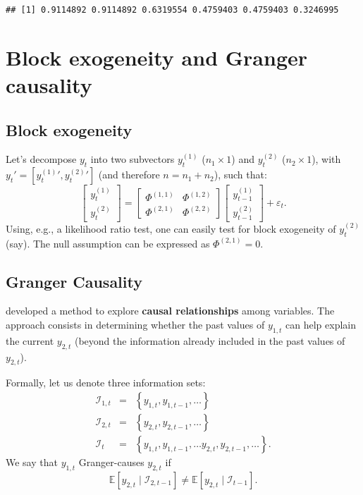 \documentclass[
  12pt,
]{book}
\theoremstyle{definition}
\theoremstyle{definition}
\theoremstyle{definition}
\theoremstyle{definition}
\theoremstyle{remark}
\begin{document}
\begin{verbatim}
## [1] 0.9114892 0.9114892 0.6319554 0.4759403 0.4759403 0.3246995
\end{verbatim}

\hypertarget{BlockGranger}{%
\section{Block exogeneity and Granger causality}\label{BlockGranger}}

\hypertarget{block-exogeneity}{%
\subsection{Block exogeneity}\label{block-exogeneity}}

Let's decompose \(y_t\) into two subvectors \(y^{(1)}_{t}\) (\(n_1 \times 1\)) and \(y^{(2)}_{t}\) (\(n_2 \times 1\)), with \(y_t' = [{y^{(1)}_{t}}',{y^{(2)}_{t}}']\) (and therefore \(n=n_1 +n_2\)), such that:
\[
\left[
\begin{array}{c}
y^{(1)}_{t}\\
y^{(2)}_{t}
\end{array}
\right] = \left[
\begin{array}{cc}
\Phi^{(1,1)} & \Phi^{(1,2)}\\
\Phi^{(2,1)} & \Phi^{(2,2)}
\end{array}
\right]
\left[
\begin{array}{c}
y^{(1)}_{t-1}\\
y^{(2)}_{t-1}
\end{array}
\right] + \varepsilon_t.
\]
Using, e.g., a likelihood ratio test, one can easily test for block exogeneity of \(y_t^{(2)}\) (say). The null assumption can be expressed as \(\Phi^{(2,1)}=0\).

\hypertarget{granger-causality}{%
\subsection{Granger Causality}\label{granger-causality}}

\citet{Granger_1969} developed a method to explore \textbf{causal relationships} among variables. The approach consists in determining whether the past values of \(y_{1,t}\) can help explain the current \(y_{2,t}\) (beyond the information already included in the past values of \(y_{2,t}\)).

Formally, let us denote three information sets:
\begin{eqnarray*}
\mathcal{I}_{1,t} & = & \left\{ y_{1,t},y_{1,t-1},\ldots\right\} \\
\mathcal{I}_{2,t} & = & \left\{ y_{2,t},y_{2,t-1},\ldots\right\} \\
\mathcal{I}_{t} & = & \left\{ y_{1,t},y_{1,t-1},\ldots y_{2,t},y_{2,t-1},\ldots\right\}.
\end{eqnarray*}
We say that \(y_{1,t}\) Granger-causes \(y_{2,t}\) if
\[
\mathbb{E}\left[y_{2,t}\mid \mathcal{I}_{2,t-1}\right]\neq \mathbb{E}\left[y_{2,t}\mid \mathcal{I}_{t-1}\right].
\]
\end{document}
